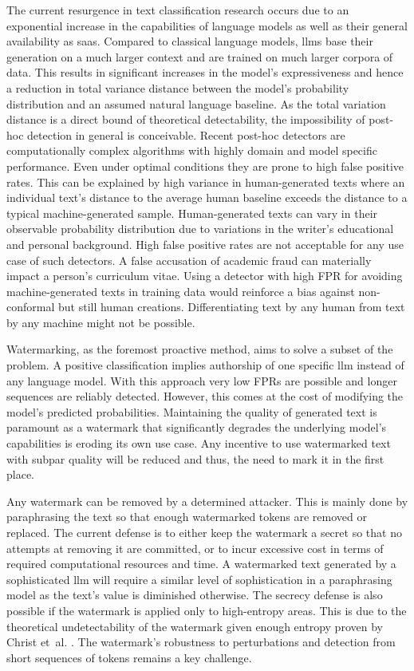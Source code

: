     The current resurgence in text classification research occurs due to an exponential increase in the capabilities of language models as well as their general availability as \ac{saas}.
    Compared to classical language models, \acp{llm} base their generation on a much larger context and are trained on much larger corpora of data.
    This results in significant increases in the model's expressiveness and hence a reduction in total variance distance between the model's probability distribution and an assumed natural language baseline.
    As the total variation distance is a direct bound of theoretical detectability, the impossibility of post-hoc detection in general is conceivable.
    Recent post-hoc detectors are computationally complex algorithms with highly domain and model specific performance.
    Even under optimal conditions they are prone to high false positive rates.
    This can be explained by high variance in human-generated texts where an individual text's distance to the average human baseline exceeds the distance to a typical machine-generated sample.
    Human-generated texts can vary in their observable probability distribution due to variations in the writer's educational and personal background.
    High false positive rates are not acceptable for any use case of such detectors.
    A false accusation of academic fraud can materially impact a person's curriculum vitae.
    Using a detector with high FPR for avoiding machine-generated texts in training data would reinforce a bias against non-conformal but still human creations.
    Differentiating text by any human from text by any machine might not be possible.

    Watermarking, as the foremost proactive method, aims to solve a subset of the problem.
    A positive classification implies authorship of one specific \ac{llm} instead of any language model.
    With this approach very low FPRs are possible and longer sequences are reliably detected.
    However, this comes at the cost of modifying the model's predicted probabilities.
    Maintaining the quality of generated text is paramount as a watermark that significantly degrades the underlying model's capabilities is eroding its own use case.
    Any incentive to use watermarked text with subpar quality will be reduced and thus, the need to mark it in the first place.

    Any watermark can be removed by a determined attacker.
    This is mainly done by paraphrasing the text so that enough watermarked tokens are removed or replaced.
    The current defense is to either keep the watermark a secret so that no attempts at removing it are committed, or to incur excessive cost in terms of required computational resources and time.
    A watermarked text generated by a sophisticated \ac{llm} will require a similar level of sophistication in a paraphrasing model as the text's value is diminished otherwise.
    The secrecy defense is also possible if the watermark is applied only to high-entropy areas.
    This is due to the theoretical undetectability of the watermark given enough entropy proven by Christ et~al. \cite{christ2023undetectable}. 
    The watermark's robustness to perturbations and detection from short sequences of tokens remains a key challenge.

